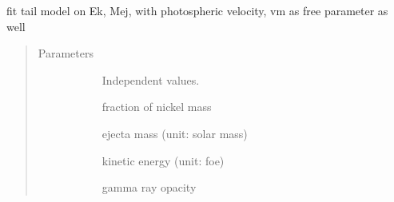 \documentclass[letterpaper,10pt,english]{sphinxmanual}
\begin{document}
\begin{fulllineitems}
\label{\detokenize{generated/sdapy.models.arnett_tail.tail_fit_Mej_Ek:sdapy.models.arnett_tail.tail_fit_Mej_Ek}}
fit tail model on Ek, Mej, with photospheric velocity, vm as free parameter as well
\begin{quote}\begin{description}
\item[{Parameters}] \leavevmode\begin{description}
\item[{}] \leavevmode{[}\sphinxtitleref{array}{]}
Independent values.

\item[{}] \leavevmode{[}\sphinxtitleref{float}{]}
fraction of nickel mass

\item[{}] \leavevmode{[}\sphinxtitleref{float}{]}
ejecta mass (unit: solar mass)

\item[{}] \leavevmode{[}\sphinxtitleref{float}{]}
kinetic energy (unit: foe)

\item[{}] \leavevmode{[}\sphinxtitleref{float}{]}
gamma ray opacity

\end{description}

\end{description}\end{quote}

\end{fulllineitems}


\end{document}
